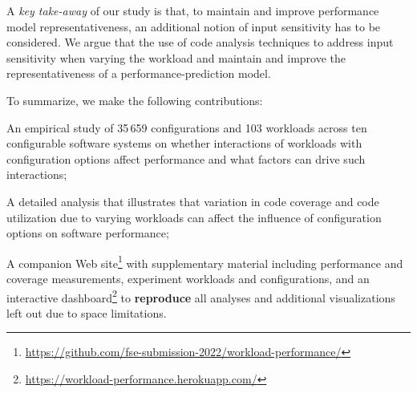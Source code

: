 A \textit{key take-away} of our study is that, to maintain and improve performance model representativeness, an additional notion of input sensitivity has to be considered. We argue that the use of code analysis techniques to address input sensitivity when varying the workload and maintain and improve the representativeness of a performance-prediction model.

To summarize, we make the following contributions: 

\begin{compactitem}
	\item An empirical study of 35\,659 configurations and 103 workloads across ten configurable software systems on whether interactions of workloads with configuration options affect performance and what factors can drive such interactions;
	
	\item A detailed analysis that illustrates that variation in code coverage and code utilization due to varying workloads can affect the influence of configuration options on software performance; 
	
	\item A companion Web site\footnote{\url{https://github.com/fse-submission-2022/workload-performance/}} with supplementary material including performance and coverage measurements, experiment workloads and configurations, and an interactive dashboard\footnote{\url{https://workload-performance.herokuapp.com/}} to \textbf{reproduce} all analyses and additional visualizations left out due to space limitations.
	
	\item \cite{han_confprof_2021}
\end{compactitem}


